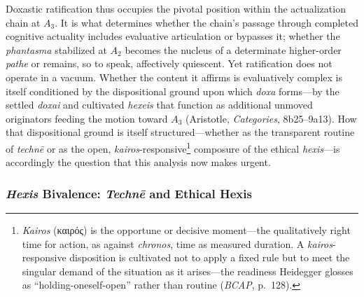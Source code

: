 \documentclass{article}
\newcommand{\gk}[1]{{\greekfont #1}}
\begin{document}
Doxastic ratification thus occupies the pivotal position within the actualization chain at $A_3$. It is what determines whether the chain's passage through completed cognitive actuality includes evaluative articulation or bypasses it; whether the \textit{phantasma} stabilized at $A_2$ becomes the nucleus of a determinate higher-order \textit{pathe} or remains, so to speak, affectively quiescent. Yet ratification does not operate in a vacuum. Whether the content it affirms is evaluatively complex is itself conditioned by the dispositional ground upon which \textit{doxa} forms---by the settled \textit{doxai} and cultivated \textit{hexeis} that function as additional unmoved originators feeding the motion toward $A_3$ (Aristotle, \textit{Categories}, 8b25--9a13). How that dispositional ground is itself structured---whether as the transparent routine of \textit{technē} or as the open, \textit{kairos}-responsive\footnote{\textit{Kairos} (\gk{καιρός}) is the opportune or decisive moment---the qualitatively right time for action, as against \textit{chronos}, time as measured duration. A \textit{kairos}-responsive disposition is cultivated not to apply a fixed rule but to meet the singular demand of the situation as it arises---the readiness Heidegger glosses as ``holding-oneself-open'' rather than routine (\textit{BCAP}, p.~128).} composure of the ethical \textit{hexis}---is accordingly the question that this analysis now makes urgent.


\subsubsection*{\textit{Hexis} Bivalence: \textit{Technē} and Ethical Hexis}
\end{document}
